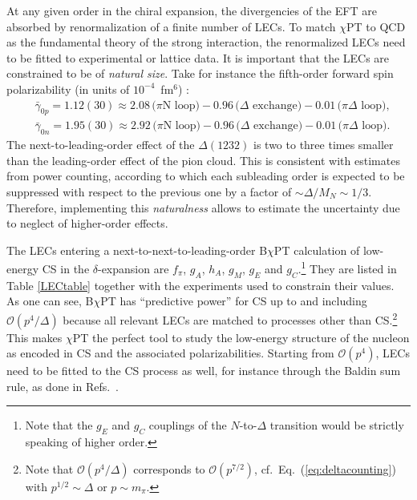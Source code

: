 \documentclass[preprints,review,accept,moreauthors,pdftex]{Definitions/mdpi}
\def\Eqref#1{Eq.~(\ref{eq:#1})}
\begin{document}
At any given order in the chiral expansion, the divergencies of the EFT
are absorbed by renormalization of a finite number of LECs.
To match $\chi$PT to QCD as the fundamental theory of the strong interaction, the renormalized LECs need to be fitted to experimental or lattice data. It is important that the LECs are constrained to be of {\it natural size}. Take for instance the
fifth-order forward spin polarizability (in units of $10^{-4}$~fm$^6$) \cite{Alarcon:2020icz}:
\begin{subequations}
\begin{align}
&\bar\gamma_{0p} =1.12(30)\approx 2.08\,\mbox{($\pi$N loop)} -0.96\,\mbox{($\Delta$ exchange)} -0.01\, \mbox{($\pi\Delta$ loop)}, \label{Eq:gamma0ProtonRealPoint}\\
&\bar\gamma_{0n} =1.95 (30) \approx 2.92\,\mbox{($\pi$N loop)}-0.96\,\mbox{($\Delta$ exchange)} -0.01\, \mbox{($\pi\Delta$ loop)}.
\end{align}
\end{subequations}
The next-to-leading-order effect of the $\Delta(1232)$ is two to three times smaller than the leading-order effect of the pion cloud. This is consistent with estimates from power counting, according to which each subleading order is expected to be suppressed with respect to the previous one by a factor of $\sim\varDelta/M_N\sim 1/3$.
Therefore, implementing this {\it naturalness} allows to estimate the uncertainty due to neglect of higher-order effects.

The LECs entering a next-to-next-to-leading-order B$\chi$PT calculation of low-energy CS in the $\delta$-expansion are $f_\pi$, $g_A$, $h_A$, $g_M$, $g_E$ and $g_C$.\footnote{Note that the $g_E$ and $g_C$ couplings of the $N$-to-$\Delta$ transition would be strictly speaking of higher order.} They are listed in Table \ref{LECtable} together with the experiments used to constrain their values. As one can see, B$\chi$PT has 
``predictive power'' for CS up to and including $\mathcal{O}(p^4/\varDelta)$ because all relevant LECs are matched to processes other than CS.\footnote{Note that $\mathcal{O}(p^4/\varDelta)$ corresponds to $\mathcal{O}(p^{7/2})$, cf.\ \Eqref{deltacounting} with $p
^{1/2} \sim \varDelta $ or $p \sim m_\pi$.} This makes $\chi$PT the perfect tool to study the low-energy structure of the nucleon as encoded in CS and the associated polarizabilities. Starting from $\mathcal{O}(p^4)$, LECs need to be fitted to the CS process as well, for instance through the Baldin sum rule, as done in  Refs.~\cite{McGovern:2012ew,Griesshammer:2012we,Lensky:2014efa,Griesshammer:2015ahu,Alarcon:2020wjg}. 
\end{document}
